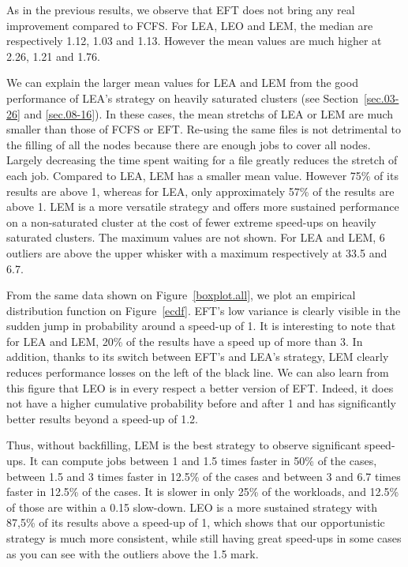 \documentclass[conference,10pt]{IEEEtran}
\begin{document}
As in the previous results, we observe that EFT does not bring any real improvement compared to FCFS.
For LEA, LEO and LEM, the median are respectively 1.12, 1.03 and 1.13. 
However the mean values are much higher at 2.26, 1.21 and 1.76.

We can explain the larger mean values for LEA and LEM from the good performance of LEA's strategy
on heavily saturated clusters (see Section~\ref{sec.03-26} and \ref{sec.08-16}).
In these cases, the mean stretchs of LEA or LEM are much smaller than those of FCFS or EFT.
Re-using the same files is not detrimental to the filling of all the nodes because there are 
enough jobs to cover all nodes.
Largely decreasing the time spent waiting for a file greatly reduces the stretch of each job.
Compared to LEA, LEM has a smaller mean value.
However 75\% of its results are above 1, whereas for LEA, only approximately 57\% of the results are above 1. 
LEM is a more versatile strategy and offers more sustained performance on a non-saturated cluster at the cost
of fewer extreme speed-ups on heavily saturated clusters.
The maximum values are not shown. For LEA and LEM, 6 outliers are above the upper whisker with 
a maximum respectively at 33.5 and 6.7.

From the same data shown on Figure~\ref{boxplot.all}, we plot an empirical distribution function on Figure~\ref{ecdf}.
EFT's low variance is clearly visible in the sudden jump in probability around a speed-up of 1.
It is interesting to note that for LEA and LEM, 20\% of the results have a speed up of more than 3.
In addition, thanks to its switch between EFT's and LEA's strategy, LEM clearly reduces
performance losses on the left of the black line.
We can also learn from this figure that LEO is in every respect a better version of EFT.
Indeed, it does not have a higher cumulative probability before and
after 1 and has significantly better
results beyond a speed-up of 1.2.

Thus, without backfilling, LEM is the best strategy to observe significant speed-ups.
It can compute jobs between 1 and 1.5 times faster in 50\% of the cases,
between 1.5 and 3 times faster in 12.5\% of the cases and between 3 and 6.7 times faster in 12.5\% of the cases.
It is slower in only 25\% of the workloads, and 12.5\% of those are within a 0.15 slow-down.
LEO is a more sustained strategy with 87,5\% of its results above a speed-up of 1, which shows that our opportunistic
strategy is much more consistent, while still having great speed-ups in some cases as you can 
see with the outliers above the 1.5 mark.
\end{document}

